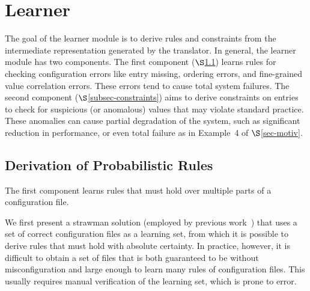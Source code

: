 \section{Learner}
\label{sec-learn}


The goal of the learner module is to derive rules and constraints from
the intermediate representation generated by the translator.
In general, the learner module has two components.
The first component ($\S$\ref{subsec-rules}) 
learns rules for checking configuration errors like
entry missing, ordering errors, and fine-grained value correlation errors. 
These errors tend to cause total system failures.
The second component ($\S$\ref{subsec-constraints}) 
aims to derive 
constraints on entries to check for suspicious (or anomalous) values 
that may violate standard practice. These anomalies can cause partial 
degradation of the system, 
such as significant reduction in performance, or even 
total failure as in Example~4 of $\S$\ref{sec-motiv}.

\subsection{Derivation of Probabilistic Rules}
\label{subsec-rules}

The first component learns rules 
that must hold over multiple parts of a configuration file.

We first present a strawman solution (employed by
previous work~\cite{santolucitoCAV, zhang14encore}) that uses 
a set of correct configuration files as a learning set, 
from which it is possible to derive rules 
that must hold with absolute certainty. 
In practice, however, it is difficult to obtain a set of files 
that is both guaranteed to be without misconfiguration 
and large enough to learn many rules of configuration files.
This usually requires manual verification of the learning set, 
which is prone to error.


